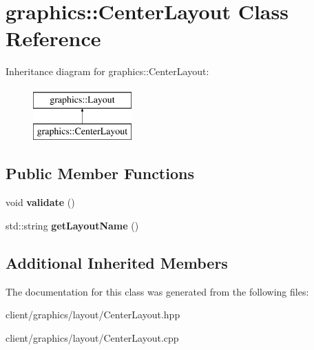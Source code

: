 \hypertarget{classgraphics_1_1_center_layout}{\section{graphics\-:\-:Center\-Layout Class Reference}
\label{classgraphics_1_1_center_layout}
}
Inheritance diagram for graphics\-:\-:Center\-Layout\-:\begin{figure}[H]
\begin{center}
\leavevmode
\includegraphics[height=2.000000cm]{classgraphics_1_1_center_layout}
\end{center}
\end{figure}
\subsection*{Public Member Functions}
\begin{DoxyCompactItemize}
\item 
\hypertarget{classgraphics_1_1_center_layout_a8283ff5828d22a787b40f4221b209bdc}{void {\bfseries validate} ()}\label{classgraphics_1_1_center_layout_a8283ff5828d22a787b40f4221b209bdc}

\item 
\hypertarget{classgraphics_1_1_center_layout_af1bb4fa6ac2177421dbe6cc0076b78eb}{std\-::string {\bfseries get\-Layout\-Name} ()}\label{classgraphics_1_1_center_layout_af1bb4fa6ac2177421dbe6cc0076b78eb}

\end{DoxyCompactItemize}
\subsection*{Additional Inherited Members}


The documentation for this class was generated from the following files\-:\begin{DoxyCompactItemize}
\item 
client/graphics/layout/Center\-Layout.\-hpp\item 
client/graphics/layout/Center\-Layout.\-cpp\end{DoxyCompactItemize}
